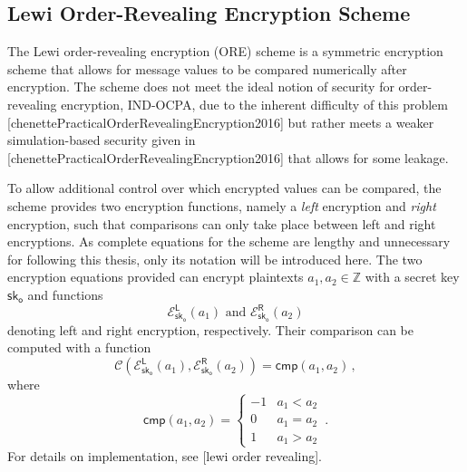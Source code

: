 % 
% 

\subsection{Lewi Order-Revealing Encryption Scheme}\label{subsec:prelims:lewi_ore}
The Lewi order-revealing encryption (ORE) scheme is a symmetric encryption scheme that allows for message values to be compared numerically after encryption. The scheme does not meet the ideal notion of security for order-revealing encryption, IND-OCPA, due to the inherent difficulty of this problem [chenettePracticalOrderRevealingEncryption2016] but rather meets a weaker simulation-based security given in [chenettePracticalOrderRevealingEncryption2016] that allows for some leakage.

To allow additional control over which encrypted values can be compared, the scheme provides two encryption functions, namely a \textit{left} encryption and \textit{right} encryption, such that comparisons can only take place between left and right encryptions. As complete equations for the scheme are lengthy and unnecessary for following this thesis, only its notation will be introduced here. The two encryption equations provided can encrypt plaintexts $a_1,a_2\in\mathbb{Z}$ with a secret key $\mathsf{sk}_{\mathsf{o}}$ and functions
\begin{equation}\label{eq:prelims:lewi_enc}
    \mathcal{E}^{\mathsf{L}}_{\mathsf{sk}_{\mathsf{o}}}\left(a_1\right)\text{ and }\mathcal{E}^{\mathsf{R}}_{\mathsf{sk}_{\mathsf{o}}}\left(a_2\right)
\end{equation}
denoting left and right encryption, respectively. Their comparison can be computed with a function
\begin{equation}\label{eq:prelims:lewi_comp}
    \mathcal{C}\left(\mathcal{E}^{\mathsf{L}}_{\mathsf{sk}_{\mathsf{o}}}(a_1), \mathcal{E}^{\mathsf{R}}_{\mathsf{sk}_{\mathsf{o}}}(a_2)\right) = \mathsf{cmp}(a_1, a_2)\,,
\end{equation}
where
\begin{equation*}
    \mathsf{cmp}(a_1, a_2)=
    \begin{cases}
        -1 & a_1 < a_2\\
        0 & a_1 = a_2\\
        1 & a_1 > a_2
    \end{cases}\,.
\end{equation*}
For details on implementation, see [lewi order revealing].

